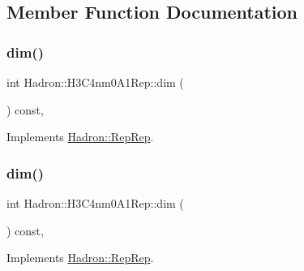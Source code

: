 \subsection{Member Function Documentation}
\mbox{\label{structHadron_1_1H3C4nm0A1Rep_aeb79449c80ab770c5b96c8215d566f47}} 
\subsubsection{\texorpdfstring{dim()}{dim()}\hspace{0.1cm}{\footnotesize\ttfamily [1/5]}}
{\footnotesize\ttfamily int Hadron\+::\+H3\+C4nm0\+A1\+Rep\+::dim (\begin{DoxyParamCaption}{ }\end{DoxyParamCaption}) const\hspace{0.3cm}{\ttfamily [inline]}, {\ttfamily [virtual]}}



Implements \mbox{\hyperlink{structHadron_1_1RepRep_a92c8802e5ed7afd7da43ccfd5b7cd92b}{Hadron\+::\+Rep\+Rep}}.

\mbox{\label{structHadron_1_1H3C4nm0A1Rep_aeb79449c80ab770c5b96c8215d566f47}} 
\subsubsection{\texorpdfstring{dim()}{dim()}\hspace{0.1cm}{\footnotesize\ttfamily [2/5]}}
{\footnotesize\ttfamily int Hadron\+::\+H3\+C4nm0\+A1\+Rep\+::dim (\begin{DoxyParamCaption}{ }\end{DoxyParamCaption}) const\hspace{0.3cm}{\ttfamily [inline]}, {\ttfamily [virtual]}}



Implements \mbox{\hyperlink{structHadron_1_1RepRep_a92c8802e5ed7afd7da43ccfd5b7cd92b}{Hadron\+::\+Rep\+Rep}}.

\mbox{\label{structHadron_1_1H3C4nm0A1Rep_aeb79449c80ab770c5b96c8215d566f47}} 
